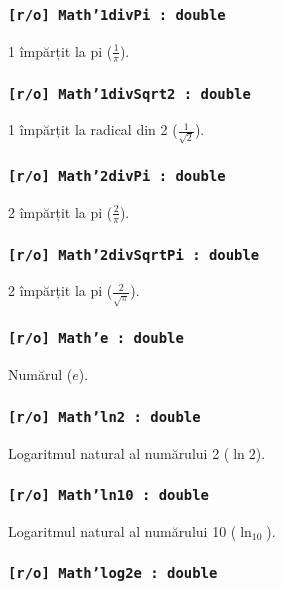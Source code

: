 \subsubsection{\texttt{[r/o] Math'1divPi : double}}

1 împărțit la pi ($\frac{1}{\pi}$).

\subsubsection{\texttt{[r/o] Math'1divSqrt2 : double}}

1 împărțit la radical din 2 ($\frac{1}{\sqrt{2}}$).

\subsubsection{\texttt{[r/o] Math'2divPi : double}}

2 împărțit la pi ($\frac{2}{\pi}$).

\subsubsection{\texttt{[r/o] Math'2divSqrtPi : double}}

2 împărțit la pi ($\frac{2}{\sqrt{\pi}}$).

\subsubsection{\texttt{[r/o] Math'e : double}}

Numărul ($e$).

\subsubsection{\texttt{[r/o] Math'ln2 : double}}

Logaritmul natural al numărului 2 ($\ln{2}$).

\subsubsection{\texttt{[r/o] Math'ln10 : double}}

Logaritmul natural al numărului 10 ($\ln_{10}$).

\subsubsection{\texttt{[r/o] Math'log2e : double}}

